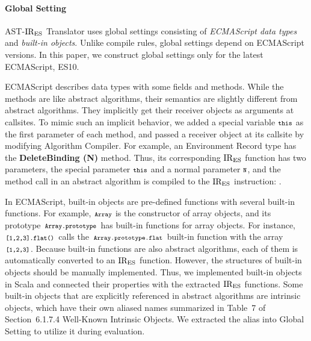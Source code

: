 \paragraph{Global Setting}
{\sf AST-\( \text{IR}_\text{ES} \) Translator} uses global settings consisting
of \textit{ECMAScript data types} and \textit{built-in objects}.
Unlike compile rules, global settings depend on
ECMAScript versions. In this paper, we construct global settings only for the
latest ECMAScript, ES10.

ECMAScript describes data types with some fields and methods.
While the methods are like abstract algorithms, their semantics are
slightly different from abstract algorithms. They implicitly get their receiver objects as
arguments at callsites.  To mimic such an implicit behavior, we added a special
variable \( \texttt{\footnotesize this} \) as the first parameter of each method, and passed a
receiver object at its callsite by modifying \textsf{Algorithm Compiler}.  For
example, an Environment Record type has the \textbf{DeleteBinding (N)} method.
Thus, its corresponding \( \text{IR}_\text{ES} \) function has two parameters, the special
parameter \( \texttt{\footnotesize this} \) and a normal parameter \( \texttt{\footnotesize N} \), and the method call
in an abstract algorithm is compiled to the \( \text{IR}_\text{ES} \) instruction:
.

In ECMAScript, built-in objects are pre-defined functions with several
built-in functions.  For example, \( \texttt{\footnotesize Array} \)
is the constructor of array objects, and its prototype
\( \texttt{\footnotesize Array.prototype} \) has built-in functions for array objects.
For instance, \( \texttt{\footnotesize[1,2,3].flat()} \) calls the
\( \texttt{\footnotesize Array.prototype.flat} \) built-in function with the array
\( \texttt{\footnotesize[1,2,3]} \).  Because built-in functions are also abstract
algorithms, each of them is automatically converted to an \( \text{IR}_\text{ES} \)
function.  However, the structures of built-in objects should be
manually implemented.  Thus, we implemented built-in objects in Scala
and connected their properties with the extracted \( \text{IR}_\text{ES} \) functions.
%
Some built-in objects that are explicitly referenced in abstract
algorithms are intrinsic objects, which have their own
aliased names summarized in Table~7 of Section~6.1.7.4
\textsf{Well-Known Intrinsic Objects}.  We extracted the alias
into \textsf{Global Setting} to utilize it during evaluation.
